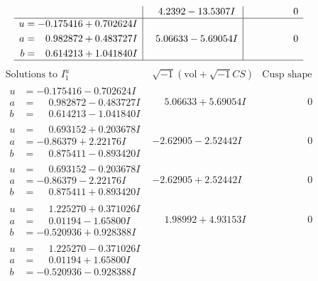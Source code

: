 \documentclass[1p]{elsarticle_modified}
\theoremstyle{definition}
\newcommand{\I}{\sqrt{-1}}
\begin{document}
$$\begin{array}{c|c|c}
 & \phantom{-}4.2392 - 13.5307 I & \phantom{-0.000000 } 0 \\ \hline\begin{aligned}
u &= -0.175416 + 0.702624 I \\
a &= \phantom{-}0.982872 + 0.483727 I \\
b &= \phantom{-}0.614213 + 1.041840 I\end{aligned}
 & \phantom{-}5.06633 - 5.69054 I & \phantom{-0.000000 } 0\\
 \hline 
 \end{array}$$\newpage$$\begin{array}{c|c|c}  
\text{Solutions to }I^u_{1}& \I (\text{vol} + \sqrt{-1}CS) & \text{Cusp shape}\\
 \hline 
\begin{aligned}
u &= -0.175416 - 0.702624 I \\
a &= \phantom{-}0.982872 - 0.483727 I \\
b &= \phantom{-}0.614213 - 1.041840 I\end{aligned}
 & \phantom{-}5.06633 + 5.69054 I & \phantom{-0.000000 } 0 \\ \hline\begin{aligned}
u &= \phantom{-}0.693152 + 0.203678 I \\
a &= -0.86379 + 2.22176 I \\
b &= \phantom{-}0.875411 - 0.893420 I\end{aligned}
 & -2.62905 - 2.52442 I & \phantom{-0.000000 } 0 \\ \hline\begin{aligned}
u &= \phantom{-}0.693152 - 0.203678 I \\
a &= -0.86379 - 2.22176 I \\
b &= \phantom{-}0.875411 + 0.893420 I\end{aligned}
 & -2.62905 + 2.52442 I & \phantom{-0.000000 } 0 \\ \hline\begin{aligned}
u &= \phantom{-}1.225270 + 0.371026 I \\
a &= \phantom{-}0.01194 - 1.65800 I \\
b &= -0.520936 + 0.928388 I\end{aligned}
 & \phantom{-}1.98992 + 4.93153 I & \phantom{-0.000000 } 0 \\ \hline\begin{aligned}
u &= \phantom{-}1.225270 - 0.371026 I \\
a &= \phantom{-}0.01194 + 1.65800 I \\
b &= -0.520936 - 0.928388 I\end{aligned}

\end{array}$$
\end{document}
